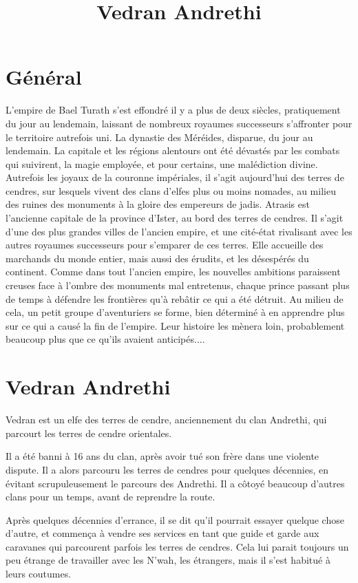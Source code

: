 \documentclass[10pt,a4paper]{article}
\author{ }
\title{Vedran Andrethi}
\begin{document}
\section{Général}
L'empire de Bael Turath s'est effondré il y a plus de deux siècles, pratiquement du jour au lendemain, laissant de nombreux royaumes successeurs s'affronter pour le territoire autrefois uni. La dynastie des Méréides, disparue, du jour au lendemain. La capitale et les régions alentours ont été dévastés par les combats qui suivirent, la magie employée, et pour certains, une malédiction divine. Autrefois les joyaux de la couronne impériales, il s'agit aujourd'hui des terres de cendres, sur lesquels vivent des clans d'elfes plus ou moins nomades, au milieu des ruines des monuments à la gloire des empereurs de jadis.
Atrasis est l'ancienne capitale de la province d'Ister, au bord des terres de cendres. Il s'agit d'une des plus grandes villes de l'ancien empire, et une cité-état rivalisant avec les autres royaumes successeurs pour s'emparer de ces terres. Elle accueille des marchands du monde entier, mais aussi des érudits, et les désespérés du continent.
Comme dans tout l'ancien empire, les nouvelles ambitions paraissent creuses face à l'ombre des monuments mal entretenus, chaque prince passant plus de temps à défendre les frontières qu'à rebâtir ce qui a été détruit.
Au milieu de cela, un petit groupe d'aventuriers se forme, bien déterminé à en apprendre plus sur ce qui a causé la fin de l'empire. Leur histoire les mènera loin, probablement beaucoup plus que ce qu'ils avaient anticipés....

\section{Vedran Andrethi}
Vedran est un elfe des terres de cendre, anciennement du clan Andrethi, qui parcourt les terres de cendre orientales. 

Il a été banni à 16 ans du clan, après avoir tué son frère dans une violente dispute. Il a alors parcouru les terres de cendres pour quelques décennies, en évitant scrupuleusement le parcours des Andrethi. Il a côtoyé beaucoup d'autres clans pour un temps, avant de reprendre la route. 

Après quelques décennies d'errance, il se dit qu'il pourrait essayer quelque chose d'autre, et commença à vendre ses services en tant que guide et garde aux caravanes qui parcourent parfois les terres de cendres. Cela lui parait toujours un peu étrange de travailler avec les N'wah, les étrangers, mais il s'est habitué à leurs coutumes.
\end{document}
